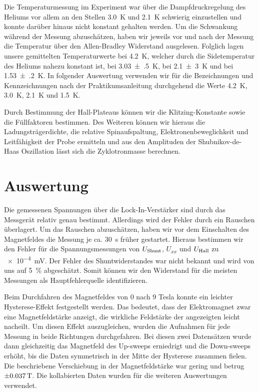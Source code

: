 \documentclass[paper=a4,fontsize=10pt,DIV=18,twocolumn,parskip=half]{scrartcl}
\numberwithin{equation}{section}    %
\begin{document}
Die Temperaturmessung im Experiment war über die Dampfdruckregelung des Heliums vor allem an den Stellen \SI{3.0}{\kelvin} und \SI{2.1}{\kelvin} schwierig einzustellen und konnte darüber hinaus nicht konstant gehalten werden. Um die Schwankung während der Messung abzuschätzen, haben wir jeweils vor und nach der Messung die Temperatur über den Allen-Bradley Widerstand ausgelesen. Folglich lagen unsere gemittelten Temperaturwerte bei \SI{4.2}{\kelvin}, welcher durch die Sidetemperatur des Heliums nahezu konstant ist, bei \SI{3.03(50)}{\kelvin}, bei \SI{2.1(30)}{\kelvin} und bei \SI{1.53(20)}{\kelvin}. In folgender Auswertung verwenden wir für die Bezeichnungen und Kennzeichnungen nach der Praktikumsanleitung durchgehend die Werte \SI{4.2}{\kelvin}, \SI{3.0}{\kelvin}, \SI{2.1}{\kelvin} und \SI{1.5}{\kelvin}.

Durch Bestimmung der Hall-Plateaus können wir die Klitzing-Konstante sowie die Füllfaktoren bestimmen. Des Weiteren können wir hieraus die Ladungsträgerdichte, die relative Spinaufspaltung, Elektronenbeweglichkeit und Leitfähigkeit der Probe ermitteln und aus den Amplituden der Shubnikov-de-Haas Oszillation lässt sich die Zyklotronmasse berechnen.

%
\section{Auswertung}
\label{Auswertung}
%



Die gemessenen Spannungen über die Lock-In-Verstärker sind durch das Messgerät relativ genau bestimmt. Allerdings wird der Fehler durch ein Rauschen überlagert. Um das Rauschen abzuschätzen, haben wir vor dem Einschalten des Magnetfeldes die Messung je ca. \SI{30}{\second} früher gestartet. Hieraus bestimmen wir den Fehler für die Spannungsmessungen von $U_{\rm Shunt}$, $U_{xx}$ und $U_{\rm Hall}$ zu \SI{e-4}{\milli\volt}. Der Fehler des Shuntwiderstandes war nicht bekannt und wird von uns auf \SI{5}{\percent} abgeschätzt. Somit können wir den Widerstand für die meisten Messungen als Hauptfehlerquelle identifizieren.

Beim Durchfahren des Magnetfeldes von $0$ nach $9$ Tesla konnte ein leichter Hysterese-Effekt festgestellt werden. Das bedeutet, dass der Elektromagnet zwar eine Magnetfeldstärke anzeigt, die wirkliche Feldstärke der angezeigten leicht nacheilt. Um diesen Effekt auszugleichen, wurden die Aufnahmen für jede Messung in beide 
Richtungen durchgefahren. Bei diesen zwei Datensätzen wurde dann gleichzeitig das Magnetfeld des Up-sweeps erniedrigt und die Down-sweeps erhöht, bis die Daten symmetrisch in der Mitte der Hysterese zusammen fielen.
Die beschriebene Verschiebung in der Magnetfeldstärke war gering und betrug $\SI{\pm0.037}{\tesla}$. Die kollabierten Daten wurden für die weiteren Auswertungen verwendet.
\end{document}
